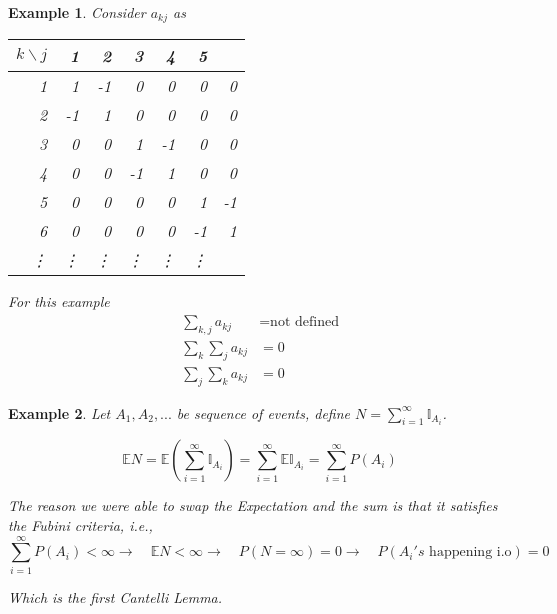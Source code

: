 \documentclass[11pt]{report}
\newtheorem{example}{Example}
\begin{document}
\begin{example}
Consider $a_{kj}$ as
\begin{center}
\begin{tabular}{|r|rrrrrr|}
\hline
 $k\backslash j$&1&2&3&4&5\\
\hline
1 & 1 & -1 &  0 &   0 &  0 & 0 \\
2 &-1 &  1 &  0 &   0 &  0 & 0 \\
3 & 0 &  0 &  1 &  -1 &  0 & 0 \\
4 & 0 &  0 & -1 &   1 &  0 & 0 \\
5 & 0 &  0 &  0 &   0 &  1 &-1 \\
6 & 0 &  0 &  0 &   0 & -1 & 1 \\
\vdots& \vdots&\vdots &\vdots &\vdots&\vdots \\
\hline
\end{tabular}
\end{center}
For this example
\begin{align*}
\sum_{k,j}a_{kj} &= \text{not defined} \\
\sum_k\sum_j a_{kj} &=  0 \\
\sum_j\sum_k a_{kj} &= 0
\end{align*}
\end{example}



\begin{example}
Let $A_1,A_2,...$ be sequence of events, define $N=\sum_{i=1}^{\infty}\mathbb{I}_{A_i}$. 

\begin{equation}
\mathbb{E}N=\mathbb{E}\left(\sum_{i=1}^{\infty}\mathbb{I}_{A_i}\right)=\sum_{i=1}^{\infty}\mathbb{E}\mathbb{I}_{A_i}=\sum_{i=1}^{\infty}P(A_i)\nonumber
\end{equation}

The reason we were able to swap the Expectation and the sum is that it satisfies the Fubini criteria, i.e., 
\begin{equation}
\sum_{i=1}^{\infty}P(A_i)<\infty \rightarrow\quad \mathbb{E}N<\infty \rightarrow\quad P(N=\infty)=0 \rightarrow \quad P(A_i's \text{  happening i.o})=0 \nonumber
\end{equation}

Which is the first Cantelli Lemma.
\end{example}



\end{document}
